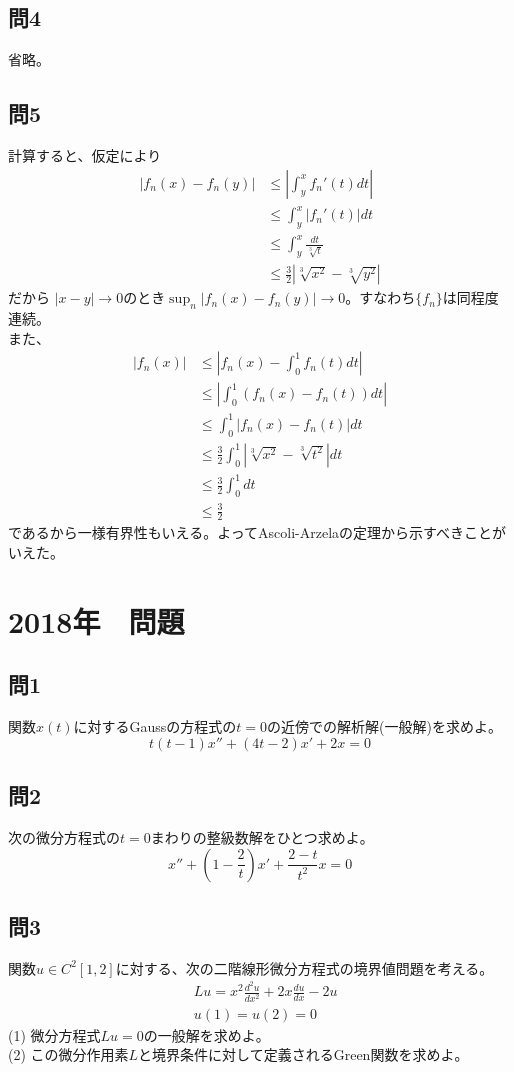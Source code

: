 \documentclass{jsarticle}
\begin{document}
\subsection*{問4}
省略。

\subsection*{問5}
計算すると、仮定により
\begin{align*}
  |f_n(x) - f_n(y)| &\leq \left|\int_y^x f_n'(t)dt \right| \\
& \leq \int_y^x |f_n'(t)|dt \\
& \leq \int_y^x \frac{dt}{\sqrt[3]{t}} \\
& \leq \frac{3}{2} |\sqrt[3]{x^2}-\sqrt[3]{y^2}|
\end{align*}
だから
$|x-y| \rightarrow 0$のとき$\sup_n |f_n(x)-f_n(y)|\rightarrow 0$。すなわち$\{ f_n\}$は同程度連続。\\
また、
\begin{align*}
  |f_n(x)| &\leq \left| f_n(x) - \int_0^1 f_n(t)dt \right| \\
  &\leq \left|  \int_0^1(f_n(x) - f_n(t))dt \right| \\
  &\leq  \int_0^1 | f_n(x) - f_n(t) |dt \\
  &\leq  \frac{3}{2} \int_0^1 |\sqrt[3]{x^2}- \sqrt[3]{t^2}|dt \\
  &\leq \frac{3}{2} \int_0^1 dt　\\
  &\leq \frac{3}{2}
\end{align*}
であるから一様有界性もいえる。よってAscoli-Arzelaの定理から示すべきことがいえた。

\newpage
\section*{2018年　問題}
\subsection*{問1}
関数$x(t)$に対するGaussの方程式の$t=0$の近傍での解析解(一般解)を求めよ。
$$
t(t-1)x''+(4t-2)x'+2x=0
$$

\subsection*{問2}
次の微分方程式の$t=0$まわりの整級数解をひとつ求めよ。
$$
x''+\left( 1- \frac{2}{t} \right)x' + \frac{2-t}{t^2}x=0
$$

\subsection*{問3}
関数$u \in C^2[1,2]$に対する、次の二階線形微分方程式の境界値問題を考える。
\begin{align*}
  &Lu = x^2 \frac{d^2u}{dx^2} + 2x\frac{du}{dx} -2u \\
  &u(1)=u(2)=0
\end{align*}
(1) 微分方程式$Lu=0$の一般解を求めよ。\\
(2) この微分作用素$L$と境界条件に対して定義されるGreen関数を求めよ。
\end{document}
